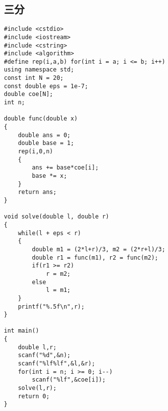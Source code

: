 \documentclass[twoside]{article}
\begin{document}
\subsection{三分}
\begin{lstlisting}
#include <cstdio>
#include <iostream>
#include <cstring>
#include <algorithm>
#define rep(i,a,b) for(int i = a; i <= b; i++)
using namespace std;
const int N = 20;
const double eps = 1e-7;
double coe[N];
int n;

double func(double x)
{
	double ans = 0;
	double base = 1;
	rep(i,0,n)
	{
		ans += base*coe[i];
		base *= x;
	}
	return ans;
}

void solve(double l, double r)
{
	while(l + eps < r)
	{
		double m1 = (2*l+r)/3, m2 = (2*r+l)/3;
		double r1 = func(m1), r2 = func(m2);
		if(r1 >= r2)
			r = m2;
		else 
			l = m1;
	}
	printf("%.5f\n",r);
}

int main()
{
	double l,r;
	scanf("%d",&n);
	scanf("%lf%lf",&l,&r);
	for(int i = n; i >= 0; i--)
		scanf("%lf",&coe[i]);
	solve(l,r);
	return 0;
}\end{lstlisting}
\end{document}
